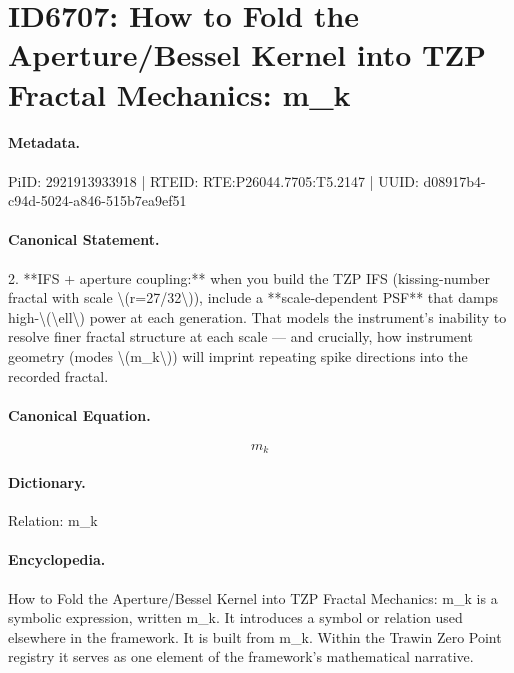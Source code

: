 \section*{ID6707: How to Fold the Aperture/Bessel Kernel into TZP Fractal Mechanics: m\_k}
\paragraph{Metadata.}
PiID: 2921913933918 | RTEID: RTE:P26044.7705:T5.2147 | UUID: d08917b4-c94d-5024-a846-515b7ea9ef51

\paragraph{Canonical Statement.}
2. **IFS + aperture coupling:** when you build the TZP IFS (kissing-number fractal with scale \textbackslash{}(r=27/32\textbackslash{})), include a **scale-dependent PSF** that damps high-\textbackslash{}(\textbackslash{}ell\textbackslash{}) power at each generation. That models the instrument’s inability to resolve finer fractal structure at each scale — and crucially, how instrument geometry (modes \textbackslash{}(m\_k\textbackslash{})) will imprint repeating spike directions into the recorded fractal.

\paragraph{Canonical Equation.}
\[
m_k
\]

\paragraph{Dictionary.}
Relation: m\_k

\paragraph{Encyclopedia.}
How to Fold the Aperture/Bessel Kernel into TZP Fractal Mechanics: m\_k is a symbolic expression, written m\_k. It introduces a symbol or relation used elsewhere in the framework. It is built from m\_k. Within the Trawin Zero Point registry it serves as one element of the framework's mathematical narrative.
